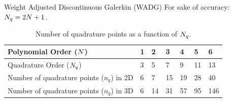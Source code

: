 \begin{frame}{Weight Adjusted Discontinuous Galerkin (WADG)}
  \scriptsize
  For sake of accuracy: ${N_q}=2{N}+1$.

\begin{table}[]
\begin{tabular}{|l|l|l|l|l|l|l|}
\hline
Polynomial Order (${N}$)            & 1 & 2  & 3  & 4  & 5  & 6  \\ \hline
Quadrature Order (${N_q}$)           & 3 & 5  & 7  & 9  & 11 & 13 \\ \hline
Number of quadrature points ($n_q$) in 2D & 6 & 7  & 15 & 19 & 28 & 40 \\ \hline
Number of quadrature points ($n_q$) in 3D & 6 & 14 & 31 & 57 & 95 & 146  \\ \hline
\end{tabular}
\caption*{\scriptsize{Number of quadrature points as a function of ${N_q}$.}}
\end{table}



\end{frame}
